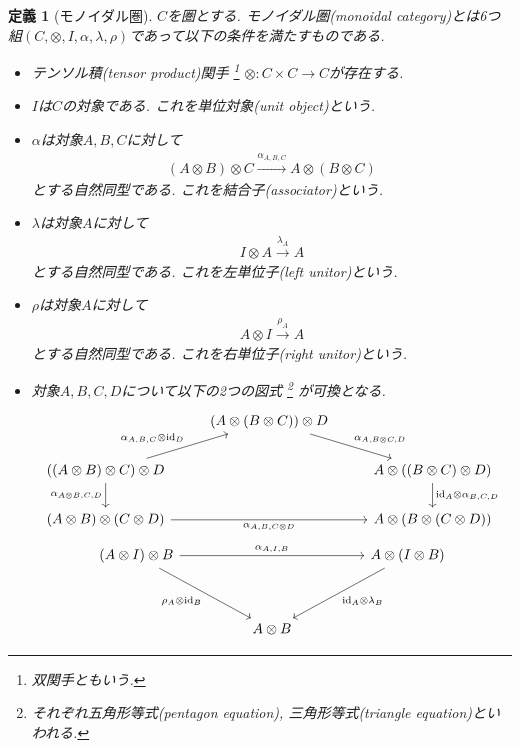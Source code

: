 \documentclass[a4paper,12pt]{ltjsarticle}
\theoremstyle{break}
\newtheorem{defn}[thm]{定義}
\newcommand{\xr}[1]{\xrightarrow{#1}}
\newcommand{\id}{\mathrm{id}}
\newcommand{\al}{\alpha}
\newcommand{\la}{\lambda}
\newcommand{\ot}{\otimes}
\newcommand{\ti}{\times}
\numberwithin{equation}{section}
\begin{document}
\begin{defn}[モノイダル圏]
  $C$を圏とする. 
  モノイダル圏(monoidal category)とは6つ組$(C,\ot, I, \al, \la, \rho)$であって以下の条件を満たすものである. 
  \begin{itemize}
    \item テンソル積(tensor product)関手
    \footnote{
    双関手ともいう. 
    }
    $\ot: C \ti C \to C$が存在する. 
    \item $I$は$C$の対象である. これを単位対象(unit object)という. 
    \item $\al$は対象$A, B, C$に対して
    \begin{align*}
      (A \ot B) \ot C \xr{\al_{A,B,C}} A \ot (B \ot C)
    \end{align*}
    とする自然同型である. 
    これを結合子(associator)という. 
    \item $\la$は対象$A$に対して
    \begin{align*}
      I \ot A \xr{\la_A} A
    \end{align*}
    とする自然同型である. 
    これを左単位子(left unitor)という. 
    \item $\rho$は対象$A$に対して
    \begin{align*}
      A \ot I \xr{\rho_A} A
    \end{align*}
    とする自然同型である. 
    これを右単位子(right unitor)という. 
    \item 対象$A, B, C, D$について以下の2つの図式
      \footnote{
      それぞれ五角形等式(pentagon equation), 三角形等式(triangle equation)といわれる. 
      }
      が可換となる. 
    \[\begin{tikzcd}
      & {(A \ot (B \ot C)) \ot D} \\
      {((A \ot B) \ot C) \ot D} && {A \ot ((B \ot C) \ot D)} \\
      {(A \ot B) \ot (C \ot D)} && {A \ot (B \ot (C \ot D))}
      \arrow["{\al_{A, B, C} \ot \id_D}", from=2-1, to=1-2]
      \arrow["{\al_{A \ot B, C, D}}"', from=2-1, to=3-1]
      \arrow["{\al_{A, B, C \ot D}}"', from=3-1, to=3-3]
      \arrow["{\al_{A, B \ot C, D}}", from=1-2, to=2-3]
      \arrow["{\id_A \ot \al_{B, C ,D}}", from=2-3, to=3-3]
    \end{tikzcd}\]
    \[\begin{tikzcd}
      {(A \ot I) \ot B} &&&& {A \ot (I \ot B)} \\
      \\
      && {A \ot B}
      \arrow["{\al_{A, I, B}}", from=1-1, to=1-5]
      \arrow["{\rho_A \ot \id_B}"', from=1-1, to=3-3]
      \arrow["{\id_A \ot \la_B}", from=1-5, to=3-3]
    \end{tikzcd}\]
  \end{itemize}
\end{defn}
\end{document}
